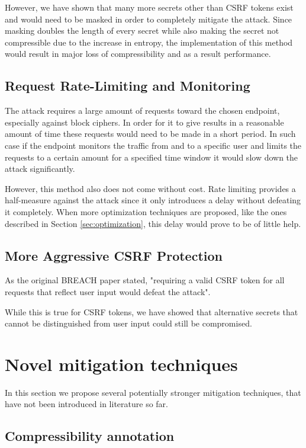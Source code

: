 However, we have shown that many more secrets other than CSRF tokens exist
and would need to be masked in order to completely mitigate the attack. Since
masking doubles the length of every secret while also making the secret not
compressible due to the increase in entropy, the implementation of this method
would result in major loss of compressibility and as a result performance.

\subsection{Request Rate-Limiting and Monitoring}

The attack requires a large amount of requests toward the chosen endpoint,
especially against block ciphers. In order for it to give results in a
reasonable amount of time these requests would need to be made in a short
period. In such case if the endpoint monitors the traffic from and to a
specific user and limits the requests to a certain amount for a specified time
window it would slow down the attack significantly.

However, this method also does not come without cost. Rate limiting provides a
half-measure against the attack since it only introduces a delay without
defeating it completely. When more optimization techniques are proposed, like
the ones described in Section \ref{sec:optimization}, this delay would prove to
be of little help.

\subsection{More Aggressive CSRF Protection}

As the original BREACH paper stated, "requiring a valid CSRF token for all
requests that reflect user input would defeat the attack".

While this is true for CSRF tokens, we have showed that alternative secrets
that cannot be distinguished from user input could still be compromised.

\section{Novel mitigation techniques}\label{sec:novel_mitigation}

In this section we propose several potentially stronger mitigation techniques,
that have not been introduced in literature so far.

\subsection{Compressibility annotation}\label{subsec:annotation}

